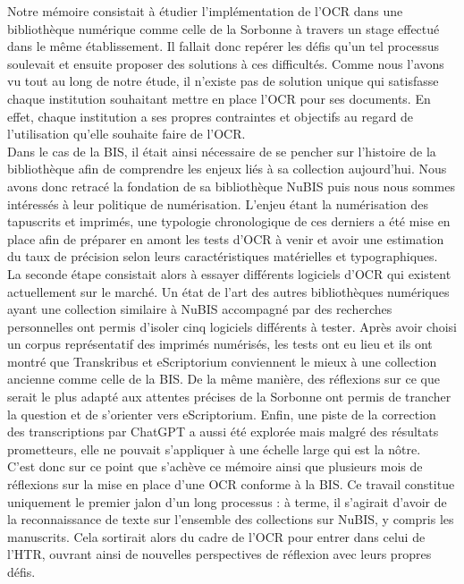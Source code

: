 \documentclass[a4paper,12pt,twoside]{book}
\begin{document}
Notre mémoire consistait à étudier l'implémentation de l'OCR dans une
bibliothèque numérique comme celle de la Sorbonne à travers un stage
effectué dans le même établissement. Il fallait donc repérer les défis
qu'un tel processus soulevait et ensuite proposer des solutions à ces
difficultés. Comme nous l'avons vu tout au long de notre étude, il
n'existe pas de solution unique qui satisfasse chaque institution
souhaitant mettre en place l'OCR pour ses documents. En effet, chaque
institution a ses propres contraintes et objectifs au regard de
l'utilisation qu'elle souhaite faire de l'OCR. \\

Dans le cas de la BIS, il était ainsi nécessaire de se pencher sur
l'histoire de la bibliothèque afin de comprendre les enjeux liés à sa
collection aujourd'hui. Nous avons donc retracé la fondation de sa
bibliothèque NuBIS puis nous nous sommes intéressés à leur politique de
numérisation. L'enjeu étant la numérisation des tapuscrits et imprimés,
une typologie chronologique de ces derniers a été mise en place afin de
préparer en amont les tests d'OCR à venir et avoir une estimation du
taux de précision selon leurs caractéristiques matérielles et
typographiques.\\

La seconde étape consistait alors à essayer différents logiciels d'OCR
qui existent actuellement sur le marché. Un état de l'art des autres
bibliothèques numériques ayant une collection similaire à NuBIS
accompagné par des recherches personnelles ont permis d'isoler cinq
logiciels différents à tester. Après avoir choisi un corpus
représentatif des imprimés numérisés, les tests ont eu lieu et ils ont
montré que Transkribus et eScriptorium conviennent le mieux à une
collection ancienne comme celle de la BIS. De la même manière, des
réflexions sur ce que serait le plus adapté aux attentes précises de la
Sorbonne ont permis de trancher la question et de s'orienter vers
eScriptorium. Enfin, une piste de la correction des transcriptions par
ChatGPT a aussi été explorée mais malgré des résultats prometteurs, elle ne pouvait s'appliquer à une échelle large qui est la nôtre. \\

C'est donc sur ce point que s'achève ce mémoire ainsi que plusieurs mois
de réflexions sur la mise en place d'une OCR conforme à la BIS. Ce
travail constitue uniquement le premier jalon d'un long processus : à
terme, il s'agirait d'avoir de la reconnaissance de texte sur l'ensemble
des collections sur NuBIS, y compris les manuscrits. Cela sortirait
alors du cadre de l'OCR pour entrer dans celui de l'HTR, ouvrant ainsi
de nouvelles perspectives de réflexion avec leurs propres défis. 
\end{document}
